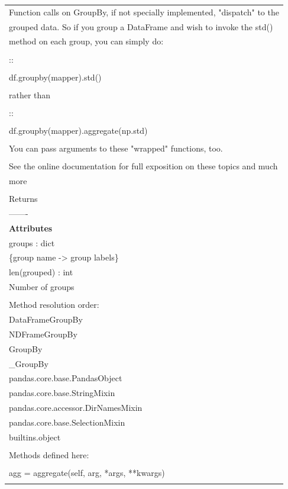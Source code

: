 \documentclass[11pt]{article}
\begin{document}
\begin{enumerate}
\begin{enumerate}
\begin{enumerate}
\begin{center}
\begin{tabular}{l}
\\
Function calls on GroupBy, if not specially implemented, "dispatch" to the\\
grouped data. So if you group a DataFrame and wish to invoke the std()\\
method on each group, you can simply do:\\
\\
::\\
\\
df.groupby(mapper).std()\\
\\
rather than\\
\\
::\\
\\
df.groupby(mapper).aggregate(np.std)\\
\\
You can pass arguments to these "wrapped" functions, too.\\
\\
See the online documentation for full exposition on these topics and much\\
more\\
\\
Returns\\
-------\\
\textbf{\textbf{Attributes}}\\
groups : dict\\
\{group name -> group labels\}\\
len(grouped) : int\\
Number of groups\\
\\
Method resolution order:\\
DataFrameGroupBy\\
NDFrameGroupBy\\
GroupBy\\
\_GroupBy\\
pandas.core.base.PandasObject\\
pandas.core.base.StringMixin\\
pandas.core.accessor.DirNamesMixin\\
pandas.core.base.SelectionMixin\\
builtins.object\\
\\
Methods defined here:\\
\\
agg = aggregate(self, arg, *args, **kwargs)\\
\\

\end{tabular}
\end{center}
\end{enumerate}
\end{enumerate}
\end{enumerate}
\end{document}
